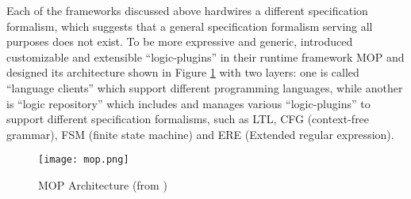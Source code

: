 Each of the frameworks discussed above hardwires a different specification formalism, which suggests that a general specification formalism serving all purposes does not exist. To be more expressive and generic, \cite{chen2007mop} introduced customizable and extensible ``logic-plugins'' in their runtime framework MOP and designed its architecture shown in Figure \ref{img:mop} with two layers: one is called ``language clients'' which support different programming languages, while another is ``logic repository'' which includes and manages various ``logic-plugins'' to support different specification formalisms, such as LTL, CFG (context-free grammar), FSM (finite state machine) and ERE (Extended regular expression).

\begin{figure}[h]
\begin{center}
\centering
\texttt{[image: mop.png]}
\caption{MOP Architecture (from \cite{chen2007mop})}
\label{img:mop}
\end{center}
\end{figure}
